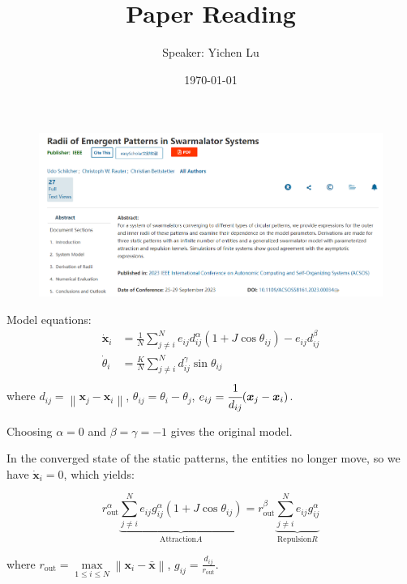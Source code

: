 \documentclass[10pt,aspectratio=43,mathserif,table]{beamer}
\title{Paper Reading}
\author{Speaker: Yichen Lu\quad \newline  \newline \quad }
\institute{\fontsize{8pt}{14pt}}
\date{\today}
\begin{document}

\begin{frame}
    \begin{figure}
        \centering
        \includegraphics[width=\textwidth]{front.jpg}
    \end{figure}
\end{frame}


\begin{frame}
    Model equations:
    $$
    \begin{aligned}
        \dot{\boldsymbol{x}}_i&=\frac{1}{N}\sum_{j\ne i}^N{e_{ij}d_{ij}^{\alpha}\left( 1+J\cos \theta _{ij} \right) -e_{ij}d_{ij}^{\beta}}\\
        \dot{\theta}_i&=\frac{K}{N}\sum_{j\ne i}^N{d_{ij}^{\gamma}\sin \theta _{ij}}\\
    \end{aligned}
    $$
    where 
    $d_{ij}=\left\| \boldsymbol{x}_j-\boldsymbol{x}_i \right\|$, 
    $\theta _{ij}=\theta _i-\theta _j$, 
    $e_{ij}=\cfrac{1}{d_{ij}}(\boldsymbol{x}_j-\boldsymbol{x}_i)$.

    Choosing $\alpha = 0$ and $\beta=\gamma=-1$ gives the original model.
\end{frame}

\begin{frame}
    In the converged state of the static patterns, the entities no longer move, so we have $\dot{\boldsymbol{x}}_i = 0$, which yields:

    $$
    r_{\mathrm{out}}^{\alpha}\underset{\mathrm{Attraction} A}{\underbrace{\sum_{j\ne i}^N{e_{ij}g_{ij}^{\alpha}\left( 1+J\cos \theta _{ij} \right)}}}=r_{\mathrm{out}}^{\beta}\underset{\mathrm{Repulsion} R}{\underbrace{\sum_{j\ne i}^N{e_{ij}g_{ij}^{\alpha}}}}
    $$

    where $r_{\mathrm{out}}=\underset{1\le i\le N}{\max}\left\| \boldsymbol{x}_i-\bar{\boldsymbol{x}} \right\| $, 
    $g_{ij}=\frac{d_{ij}}{r_{\mathrm{out}}}$.



\end{frame}






\end{document}
